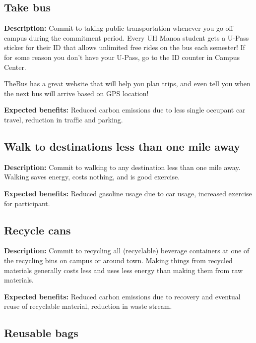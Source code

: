 \subsection{Take bus}

\textbf{Description:} Commit to taking public transportation whenever you go off campus during the commitment period. Every UH Manoa student gets a U-Pass sticker for their ID that allows unlimited free rides on the bus each semester! If for some reason you don't have your U-Pass, go to the ID counter in Campus Center.

TheBus has a great website that will help you plan trips, and even tell you when the next bus will arrive based on GPS location!

\vspace{2ex}
\textbf{Expected benefits:} Reduced carbon emissions due to less single occupant car travel, reduction in traffic and parking.


\subsection{Walk to destinations less than one mile away}

\textbf{Description:} Commit to walking to any destination less than one mile away. Walking saves energy, costs nothing, and is good exercise.

\vspace{2ex}
\textbf{Expected benefits:} Reduced gasoline usage due to car usage, increased exercise for participant.


\subsection{Recycle cans}

\textbf{Description:} Commit to recycling all (recyclable) beverage containers at one of the recycling bins on campus or around town. Making things from recycled materials generally costs less and uses less energy than making them from raw materials.

\vspace{2ex}
\textbf{Expected benefits:} Reduced carbon emissions due to recovery and eventual reuse of recyclable material, reduction in waste stream.


\subsection{Reusable bags}

